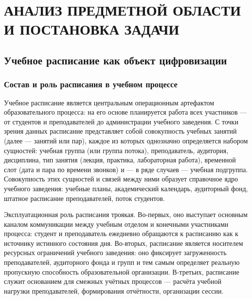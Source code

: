 
\clearpage
\section{АНАЛИЗ ПРЕДМЕТНОЙ ОБЛАСТИ И ПОСТАНОВКА ЗАДАЧИ}

\subsection{Учебное расписание как объект цифровизации}

\subsubsection{Состав и роль расписания в учебном процессе}

Учебное расписание является центральным операционным артефактом образовательного процесса: на его основе планируется работа всех участников --- от студентов и преподавателей до администрации учебного заведения. С точки зрения данных расписание представляет собой совокупность учебных занятий (далее --- занятий или пар), каждое из которых однозначно определяется набором сущностей: учебная группа (или группа потока), преподаватель, аудитория, дисциплина, тип занятия (лекция, практика, лабораторная работа), временной слот (дата и пара по времени звонков) и --- в ряде случаев --- учебная подгруппа. Совокупность этих сущностей и связей между ними образует справочное ядро учебного заведения: учебные планы, академический календарь, аудиторный фонд, штатное расписание преподавателей, поток студентов.

Эксплуатационная роль расписания троякая. Во-первых, оно выступает основным каналом коммуникации между учебным отделом и конечными участниками процесса: студент и преподаватель ежедневно обращаются к расписанию как к источнику истинного состояния дня. Во-вторых, расписание является носителем ресурсных ограничений учебного заведения: оно фиксирует загруженность преподавателей, аудиторного фонда и групп и тем самым определяет реальную пропускную способность образовательной организации. В-третьих, расписание служит основанием для смежных учётных процессов --- расчёта учебной нагрузки преподавателей, формирования отчётности, организации сессии.

